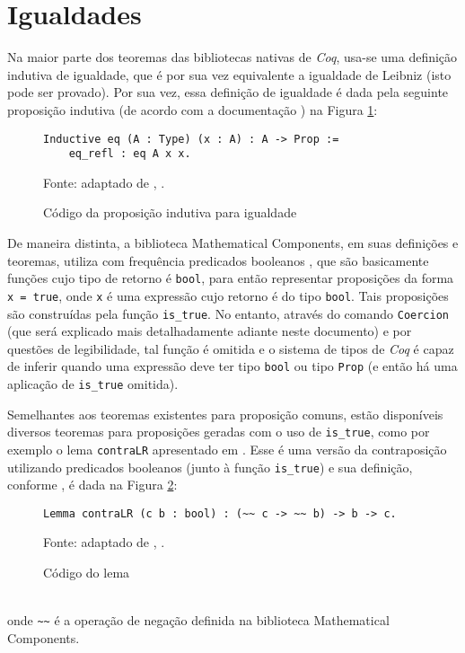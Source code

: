 \section{Igualdades}
Na maior parte dos teoremas das bibliotecas nativas de \textit{Coq}, usa-se uma definição indutiva de igualdade, que é por sua vez equivalente a igualdade de Leibniz (isto pode ser provado). Por sua vez, essa definição de igualdade é dada pela seguinte proposição indutiva (de acordo com a documentação \cite{coqteam2022manual}) na Figura \ref{fig:inductive-eq}:
    \begin{figure}[h]
    \centering
    \caption{Código da proposição indutiva para igualdade}
\begin{lstlisting}[language=coq,frame=single,tabsize=1]
Inductive eq (A : Type) (x : A) : A -> Prop := 
    eq_refl : eq A x x.
\end{lstlisting}
    \footnotesize{Fonte: adaptado de \citeauthor{coqteam2022manual}, \citeyear{coqteam2022manual}.
    }
    \label{fig:inductive-eq}
    \end{figure}

De maneira distinta, a biblioteca Mathematical Components, em suas definições e teoremas, utiliza com frequência predicados booleanos \cite{assia_mahboubi_2022_7118596}, que são basicamente funções cujo tipo de retorno é \lstinline[language = coq]!bool!, para então representar proposições da forma \lstinline[language = coq]$x = true$, onde \lstinline[language = coq]$x$ é uma expressão cujo retorno é do tipo \lstinline[language = coq]!bool!. Tais proposições são construídas pela função \lstinline[language = coq]$is_true$. No entanto, através do comando \lstinline[language = coq]$Coercion$ (que será explicado mais detalhadamente adiante neste documento) e por questões de legibilidade, tal função é omitida e o sistema de tipos de \textit{Coq} é capaz de inferir quando uma expressão deve ter tipo \lstinline[language = coq]$bool$ ou tipo \lstinline[language = coq]$Prop$ (e então há uma aplicação de \lstinline[language = coq]$is_true$ omitida). 

Semelhantes aos teoremas existentes para proposição comuns, estão disponíveis diversos teoremas para proposições geradas com o uso de \lstinline[language = coq]$is_true$, como por exemplo o lema \lstinline[language = coq]$contraLR$ apresentado em \cite{assia_mahboubi_2022_7118596}. Esse é uma versão da contraposição utilizando predicados booleanos (junto à função \lstinline[language = coq]$is_true$) e sua definição, conforme \cite{assia_mahboubi_2022_7118596}, é dada na Figura \ref{fig:lemma-contraLR}:
\begin{figure}[h]
    \centering
    \caption{Código do lema }
    \begin{lstlisting}[language=coq,frame=single,tabsize=1]
Lemma contraLR (c b : bool) : (~~ c -> ~~ b) -> b -> c.
    \end{lstlisting}
    \footnotesize{Fonte: adaptado de \citeauthor{assia_mahboubi_2022_7118596}, \citeyear{assia_mahboubi_2022_7118596}.
    }
    \label{fig:lemma-contraLR}
\end{figure}
\\onde \lstinline[language = coq]$~~$ é a operação de negação definida na biblioteca Mathematical Components.

